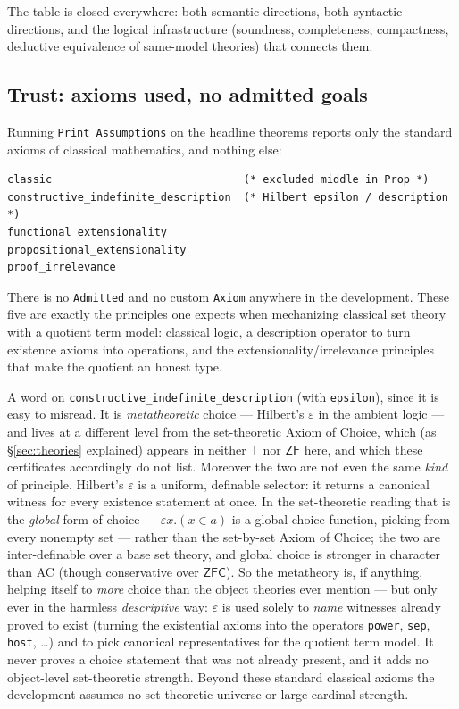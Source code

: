 \documentclass[11pt]{article}
\theoremstyle{plain}
\theoremstyle{definition}
\newcommand{\ZF}{\mathsf{ZF}}
\renewcommand{\ZF}{\textsf{ZF}}
\newcommand{\ZFC}{\textsf{ZFC}}
\newcommand{\T}{\textsf{T}}
\newcommand{\cq}[1]{\lstinline[basicstyle=\ttfamily]|#1|}
\begin{document}
The table is closed everywhere: both semantic directions, both syntactic
directions, and the logical infrastructure (soundness, completeness,
compactness, deductive equivalence of same-model theories) that connects them.

\subsection{Trust: axioms used, no admitted goals}

Running \cq{Print Assumptions} on the headline theorems reports only the standard
axioms of classical mathematics, and nothing else:

\begin{lstlisting}
classic                              (* excluded middle in Prop *)
constructive_indefinite_description  (* Hilbert epsilon / description *)
functional_extensionality
propositional_extensionality
proof_irrelevance
\end{lstlisting}

There is no \cq{Admitted} and no custom \cq{Axiom} anywhere in the development.
These five are exactly the principles one expects when mechanizing classical set
theory with a quotient term model: classical logic, a description operator to turn
existence axioms into operations, and the extensionality/irrelevance principles
that make the quotient an honest type.

A word on \cq{constructive_indefinite_description} (with \cq{epsilon}), since it is
easy to misread. It is \emph{metatheoretic} choice --- Hilbert's $\varepsilon$ in the
ambient logic --- and lives at a different level from the set-theoretic Axiom of
Choice, which (as \S\ref{sec:theories} explained) appears in neither $\T$ nor $\ZF$
here, and which these certificates accordingly do not list. Moreover the two are not
even the same \emph{kind} of principle. Hilbert's $\varepsilon$ is a uniform,
definable selector: it returns a canonical witness for every existence statement at
once. In the set-theoretic reading that is the \emph{global} form of choice ---
$\varepsilon x.(x \in a)$ is a global choice function, picking from every nonempty
set --- rather than the set-by-set Axiom of Choice; the two are inter-definable over
a base set theory, and global choice is stronger in character than AC (though
conservative over $\ZFC$). So the metatheory is, if anything, helping itself to
\emph{more} choice than the object theories ever mention --- but only ever in the
harmless \emph{descriptive} way: $\varepsilon$ is used solely to \emph{name}
witnesses already proved to exist (turning the existential axioms into the operators
\cq{power}, \cq{sep}, \cq{host}, \dots) and to pick canonical representatives for the
quotient term model. It never proves a choice statement that was not already present,
and it adds no object-level set-theoretic strength. Beyond these standard classical
axioms the development assumes no set-theoretic universe or large-cardinal strength.
\end{document}
